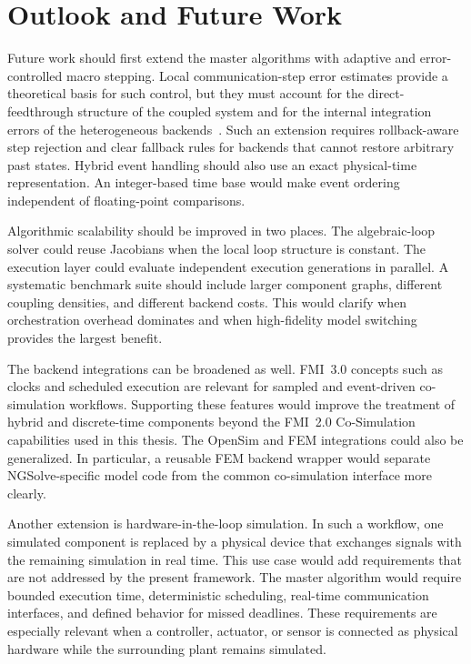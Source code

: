 \section{Outlook and Future Work}
\label{sec:discussion_outlook}

Future work should first extend the master algorithms with adaptive and error-controlled macro stepping.
Local communication-step error estimates provide a theoretical basis for such control, but they must account for the direct-feedthrough structure of the coupled system and for the internal integration errors of the heterogeneous backends~\cite{arnold_error_2013}.
Such an extension requires rollback-aware step rejection and clear fallback rules for backends that cannot restore arbitrary past states.
Hybrid event handling should also use an exact physical-time representation.
An integer-based time base would make event ordering independent of floating-point comparisons.

Algorithmic scalability should be improved in two places.
The algebraic-loop solver could reuse Jacobians when the local loop structure is constant.
The execution layer could evaluate independent execution generations in parallel.
A systematic benchmark suite should include larger component graphs, different coupling densities, and different backend costs.
This would clarify when orchestration overhead dominates and when high-fidelity model switching provides the largest benefit.

The backend integrations can be broadened as well.
FMI~3.0 concepts such as clocks and scheduled execution are relevant for sampled and event-driven co-simulation workflows.
Supporting these features would improve the treatment of hybrid and discrete-time components beyond the FMI~2.0 Co-Simulation capabilities used in this thesis.
The OpenSim and FEM integrations could also be generalized.
In particular, a reusable FEM backend wrapper would separate NGSolve-specific model code from the common co-simulation interface more clearly.

Another extension is hardware-in-the-loop simulation.
In such a workflow, one simulated component is replaced by a physical device that exchanges signals with the remaining simulation in real time.
This use case would add requirements that are not addressed by the present framework.
The master algorithm would require bounded execution time, deterministic scheduling, real-time communication interfaces, and defined behavior for missed deadlines.
These requirements are especially relevant when a controller, actuator, or sensor is connected as physical hardware while the surrounding plant remains simulated.

